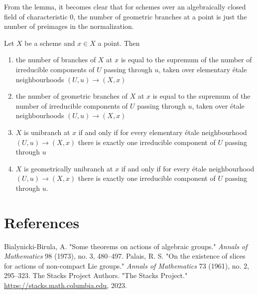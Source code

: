 \documentclass[12pt]{article}
\begin{document}
\begin{remark}
   From the lemma, it becomes clear that for schemes over an algebraically closed field of characteristic 0, the number of geometric branches at a point is just the number of preimages in the normalization.
\end{remark}

\begin{lemma}[37.36.2]
Let $X$ be a scheme and $x \in X$ a point. Then
\begin{enumerate}
    \item the number of branches of $X$ at $x$ is equal to the supremum of the number of irreducible components of $U$ passing through $u$, taken over elementary \'etale neighbourhoods $(U, u) \to (X, x)$
    \item the number of geometric branches of $X$ at $x$ is equal to the supremum of the number of irreducible components of $U$ passing through $u$, taken over \'etale neighbourhoods $(U, u) \to (X, x)$
    \item $X$ is unibranch at $x$ if and only if for every elementary \'etale neighbourhood $(U, u) \to (X, x)$
    there is exactly one irreducible component of $U$ passing through $u$
    \item $X$ is geometrically unibranch at $x$ if and only if for every \'etale neighbourhood $(U, u) \to (X, x)$
    there is exactly one irreducible component of $U$ passing through $u$.
\end{enumerate}
\end{lemma}

\section{References}
\begin{enumerate}
 Bialynicki-Birula, A. "Some theorems on actions of algebraic groups." \textit{Annals of Mathematics} 98 (1973), no. 3, 480--497.
 Palais, R. S. "On the existence of slices for actions of non-compact Lie groups." \textit{Annals of Mathematics} 73 (1961), no. 2, 295--323.
 The Stacks Project Authors. "The Stacks Project." \url{https://stacks.math.columbia.edu}, 2023.
\end{enumerate}
\end{document}
